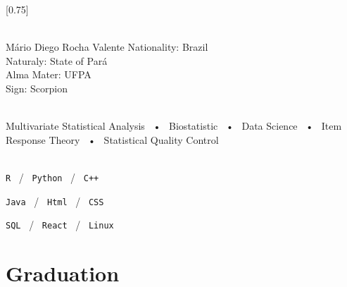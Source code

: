\documentclass[lighthipster]{simplehipstercv}
\begin{document}
\setlength{\columnsep}{1.5cm}
[0.75]
\begin{paracol}{2}

\paracolbackgroundoptions



\footnotesize
{\setasidefontcolour
\flushright
\begin{center}
\end{center}



{\footnotesize
\lorem\lorem\lorem}
\bigskip

 \\[0.5em]
Mário Diego Rocha Valente
Nationality: Brazil \\
Naturaly: State of Pará \\
Alma Mater: UFPA \\
Sign: Scorpion

\bigskip

 \\[0.5em]

Multivariate Statistical Analysis ~•~ Biostatistic ~•~ Data Science ~•~ Item Response Theory ~•~  Statistical Quality Control

\bigskip

\lorem
\bigskip

\\[0.5em]

\texttt{R} ~/~ \texttt{Python} ~/~ \texttt{C++}

\texttt{Java} ~/~ \texttt{Html} ~/~ \texttt{CSS}

\texttt{SQL} ~/~ \texttt{React} ~/~ \texttt{Linux}

\vspace{4em}


\phantom{turn the page}

\phantom{turn the page}
}
\switchcolumn

\small
\section*{Graduation}


\end{paracol}
\end{document}
